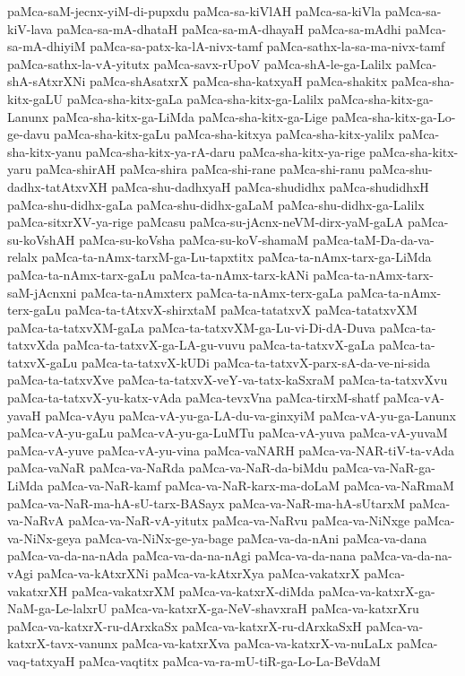 {paMca-saM-jecnx-yiM-di-pupxdu
paMca-sa-kiVlAH
paMca-sa-kiVla
paMca-sa-kiV-lava
paMca-sa-mA-dhataH
paMca-sa-mA-dhayaH
paMca-sa-mAdhi
paMca-sa-mA-dhiyiM
paMca-sa-patx-ka-lA-nivx-tamf
paMca-sathx-la-sa-ma-nivx-tamf
paMca-sathx-la-vA-yitutx
paMca-savx-rUpoV
paMca-shA-le-ga-Lalilx
paMca-shA-sAtxrXNi
paMca-shAsatxrX
paMca-sha-katxyaH
paMca-shakitx
paMca-sha-kitx-gaLU
paMca-sha-kitx-gaLa
paMca-sha-kitx-ga-Lalilx
paMca-sha-kitx-ga-Lanunx
paMca-sha-kitx-ga-LiMda
paMca-sha-kitx-ga-Lige
paMca-sha-kitx-ga-Lo-ge-davu
paMca-sha-kitx-gaLu
paMca-sha-kitxya
paMca-sha-kitx-yalilx
paMca-sha-kitx-yanu
paMca-sha-kitx-ya-rA-daru
paMca-sha-kitx-ya-rige
paMca-sha-kitx-yaru
paMca-shirAH
paMca-shira
paMca-shi-rane
paMca-shi-ranu
paMca-shu-dadhx-tatAtxvXH
paMca-shu-dadhxyaH
paMca-shudidhx
paMca-shudidhxH
paMca-shu-didhx-gaLa
paMca-shu-didhx-gaLaM
paMca-shu-didhx-ga-Lalilx
paMca-sitxrXV-ya-rige
paMcasu
paMca-su-jAcnx-neVM-dirx-yaM-gaLA
paMca-su-koVshAH
paMca-su-koVsha
paMca-su-koV-shamaM
paMca-taM-Da-da-va-relalx
paMca-ta-nAmx-tarxM-ga-Lu-tapxtitx
paMca-ta-nAmx-tarx-ga-LiMda
paMca-ta-nAmx-tarx-gaLu
paMca-ta-nAmx-tarx-kANi
paMca-ta-nAmx-tarx-saM-jAcnxni
paMca-ta-nAmxterx
paMca-ta-nAmx-terx-gaLa
paMca-ta-nAmx-terx-gaLu
paMca-ta-tAtxvX-shirxtaM
paMca-tatatxvX
paMca-tatatxvXM
paMca-ta-tatxvXM-gaLa
paMca-ta-tatxvXM-ga-Lu-vi-Di-dA-Duva
paMca-ta-tatxvXda
paMca-ta-tatxvX-ga-LA-gu-vuvu
paMca-ta-tatxvX-gaLa
paMca-ta-tatxvX-gaLu
paMca-ta-tatxvX-kUDi
paMca-ta-tatxvX-parx-sA-da-ve-ni-sida
paMca-ta-tatxvXve
paMca-ta-tatxvX-veY-va-tatx-kaSxraM
paMca-ta-tatxvXvu
paMca-ta-tatxvX-yu-katx-vAda
paMca-tevxVna
paMca-tirxM-shatf
paMca-vA-yavaH
paMca-vAyu
paMca-vA-yu-ga-LA-du-va-ginxyiM
paMca-vA-yu-ga-Lanunx
paMca-vA-yu-gaLu
paMca-vA-yu-ga-LuMTu
paMca-vA-yuva
paMca-vA-yuvaM
paMca-vA-yuve
paMca-vA-yu-vina
paMca-vaNARH
paMca-va-NAR-tiV-ta-vAda
paMca-vaNaR
paMca-va-NaRda
paMca-va-NaR-da-biMdu
paMca-va-NaR-ga-LiMda
paMca-va-NaR-kamf
paMca-va-NaR-karx-ma-doLaM
paMca-va-NaRmaM
paMca-va-NaR-ma-hA-sU-tarx-BASayx
paMca-va-NaR-ma-hA-sUtarxM
paMca-va-NaRvA
paMca-va-NaR-vA-yitutx
paMca-va-NaRvu
paMca-va-NiNxge
paMca-va-NiNx-geya
paMca-va-NiNx-ge-ya-bage
paMca-va-da-nAni
paMca-va-dana
paMca-va-da-na-nAda
paMca-va-da-na-nAgi
paMca-va-da-nana
paMca-va-da-na-vAgi
paMca-va-kAtxrXNi
paMca-va-kAtxrXya
paMca-vakatxrX
paMca-vakatxrXH
paMca-vakatxrXM
paMca-va-katxrX-diMda
paMca-va-katxrX-ga-NaM-ga-Le-lalxrU
paMca-va-katxrX-ga-NeV-shavxraH
paMca-va-katxrXru
paMca-va-katxrX-ru-dArxkaSx
paMca-va-katxrX-ru-dArxkaSxH
paMca-va-katxrX-tavx-vanunx
paMca-va-katxrXva
paMca-va-katxrX-va-nuLaLx
paMca-vaq-tatxyaH
paMca-vaqtitx
paMca-va-ra-mU-tiR-ga-Lo-La-BeVdaM
}
